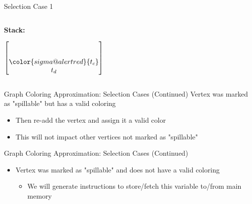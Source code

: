 \documentclass[aspectratio=169]{beamer}
\begin{document}
\begin{frame}{Selection Case 1}
    \begin{columns}
        \begin{column}{1cm}
            \textbf{Stack:}
            \vspace{0cm}
            
            $\begin{bmatrix}
                \\ \\ \color{sigma@alertred}{t_c} \\ t_d
            \end{bmatrix}$
        \end{column}
        \begin{column}{8cm}
        \end{column}
    \end{columns}
\end{frame}

\begin{frame}{Graph Coloring Approximation: Selection Cases (Continued)}
    Vertex was marked as "spillable" but has a valid coloring
    \begin{itemize}
        \item Then re-add the vertex and assign it a valid color
        \item This will not impact other vertices not marked as "spillable"
    \end{itemize}
\end{frame}

\begin{frame}{Graph Coloring Approximation: Selection Cases (Continued)}
    \begin{itemize}
        \item Vertex was marked as "spillable" and does not have a valid coloring
        \begin{itemize}
            \item We will generate instructions to store/fetch this variable to/from main memory
        \end{itemize}
    \end{itemize}
\end{frame}
\end{document}
